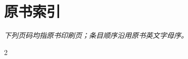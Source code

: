 
\chapter*{原书索引}
\noindent\emph{下列页码均指原书印刷页；条目顺序沿用原书英文字母序。}\par\medskip

\begingroup
\small
\setlength{\columnsep}{1.8em}
\raggedcolumns
\newcommand{\srcindexentry}[2]{%
  \par\begingroup\leftskip=#1em\relax\hangindent=1em\relax
  \noindent #2\par\endgroup}
\begin{multicols}{2}






\end{multicols}
\endgroup
